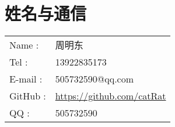 \section{姓名与通信}
\begin{tabular}{ll}
  Name : & 周明东 \\
  Tel : & 13922835173 \\
  E-mail : & 505732590@qq.com \\
  GitHub : & \url{https://github.com/catRat} \\
  QQ : & 505732590 \\
\end{tabular}
